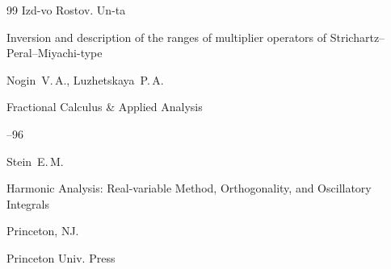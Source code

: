 \begin{thebibliography}{99}
\publ Izd-vo Rostov. Un-ta






\paper Inversion and description of the ranges of multiplier operators of Strichartz--Peral--Miyachi-type 

\by  Nogin~V.\,A., Luzhetskaya~P.\,A. 

\jour Fractional Calculus \& Applied Analysis




--96




\by Stein~E.\,M. 

\book Harmonic Analysis: Real-variable Method, Orthogonality, and Oscillatory  Integrals 

\publaddr  Princeton, NJ. 

\publ Princeton Univ. Press 







\end{thebibliography}





\noindent

\hskip6.5cm \thedate \par\noindent

\hskip6.5cm\therevdate





\makeengtitle





%

